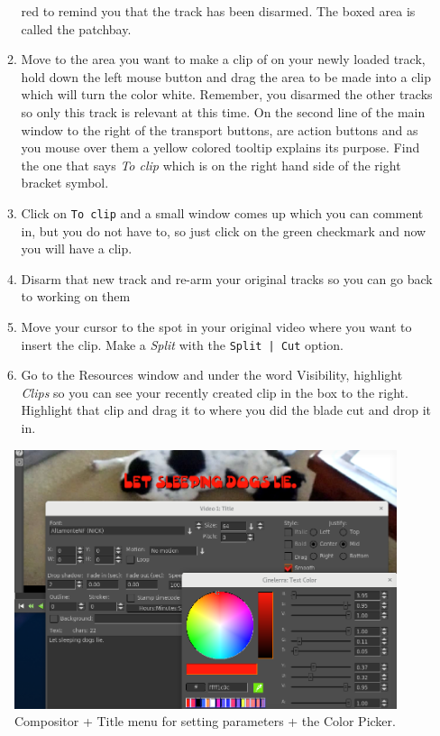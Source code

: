 \begin{enumerate}
\begin{enumerate}
		red to remind you that the track has been disarmed.  The boxed area is called the patchbay.
		\item Move to the area you want to make a clip of on your newly loaded track, hold down the left mouse
		button and drag the area to be made into a clip which will turn the color white.  Remember, you
		disarmed the other tracks so only this track is relevant at this time.  On the second line of the main
		window to the right of the transport buttons, are action buttons and as you mouse over them a
		yellow colored tooltip explains its purpose.  Find the one that says \textit{To clip} which is on the right
		hand side of the right bracket symbol.
		\item Click on \texttt{To clip} and a small window comes up which you can comment in, but you do not have
		to, so just click on the green checkmark and now you will have a clip.
		\item Disarm that new track and re-arm your original tracks so you can go back to working on them
		\item Move your cursor to the spot in your original video where you want to insert the clip.   Make a
		\textit{Split} with the \texttt{Split | Cut} option.
		\item Go to the Resources window and under the word Visibility, highlight \textit{Clips} so you can see your
		recently created clip in the box to the right.  Highlight that clip and drag it to where you did the
		blade cut and drop it in.
	\end{enumerate}
\end{enumerate}

\begin{figure}[htpb]
	\centering
	\includegraphics[width=1.0\linewidth]{images/title_color.png}
	\caption{Compositor + Title menu for setting parameters + the Color Picker.}	
\end{figure}

